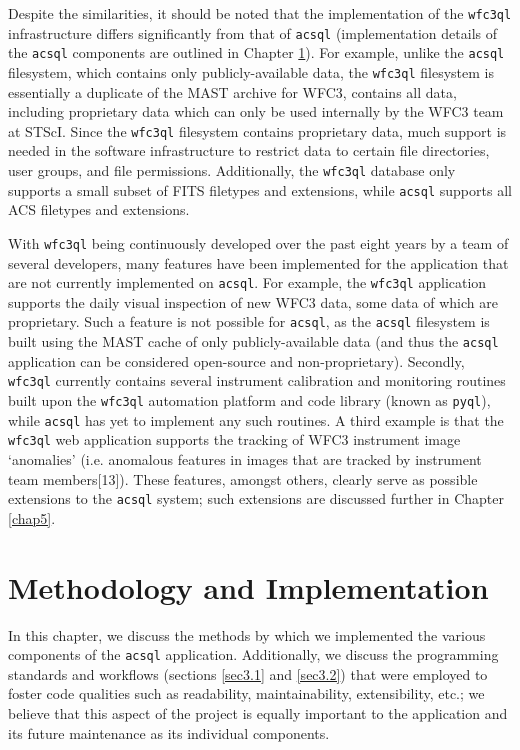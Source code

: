 \documentclass[10pt,journal,compsoc]{IEEEtran}
\begin{document}
Despite the similarities, it should be noted that the implementation of the \texttt{wfc3ql} infrastructure differs significantly from that of \texttt{acsql}
(implementation details of the \texttt{acsql} components are outlined in Chapter \ref{chap3}).  For example, unlike the \texttt{acsql} filesystem, which contains only
publicly-available data, the \texttt{wfc3ql} filesystem is essentially a duplicate of the MAST archive for WFC3, contains all data, including proprietary data which can
only be used internally by the WFC3 team at STScI.  Since the \texttt{wfc3ql} filesystem contains proprietary data, much support is needed in the software infrastructure to restrict
data to certain file directories, user groups, and file permissions.  Additionally, the \texttt{wfc3ql} database only supports a small subset of FITS filetypes and extensions, while
\texttt{acsql} supports all ACS filetypes and extensions.

With \texttt{wfc3ql} being continuously developed over the past eight years by a team of several developers, many features have been implemented for the application that are not currently
implemented on \texttt{acsql}.  For example, the \texttt{wfc3ql} application supports the daily visual inspection of new WFC3 data, some data of which
are proprietary.  Such a feature is not possible for \texttt{acsql}, as the \texttt{acsql} filesystem is built using the MAST cache of only publicly-available data (and thus the \texttt{acsql}
application can be considered open-source and non-proprietary).  Secondly, \texttt{wfc3ql} currently contains several instrument calibration and monitoring routines built upon
the \texttt{wfc3ql} automation platform and code library (known as \texttt{pyql}), while \texttt{acsql} has yet to implement any such routines.  A third example is that the \texttt{wfc3ql}
web application supports the tracking of WFC3 instrument image `anomalies' (i.e. anomalous features in images that are tracked by instrument team members[13]). These features, amongst others,
clearly serve as possible extensions to the \texttt{acsql} system; such extensions are discussed further in Chapter \ref{chap5}.


\section{Methodology and Implementation} \label{chap3}

In this chapter, we discuss the methods by which we implemented the various components of the \texttt{acsql} application.  Additionally, we discuss the programming standards and
workflows (sections \ref{sec3.1} and \ref{sec3.2}) that were employed to foster code qualities such as readability, maintainability, extensibility, etc.; we believe that this aspect
of the project is equally important to the application and its future maintenance as its individual components.
\end{document}

